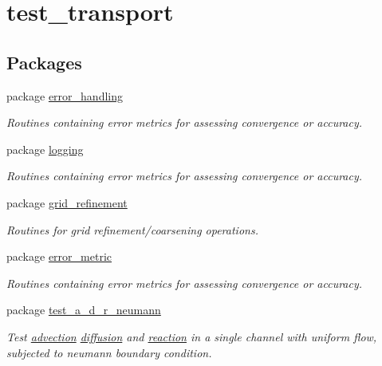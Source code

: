 \hypertarget{a00097}{
\section{test\_\-transport}
\label{a00097}
}
\subsection*{Packages}
\begin{CompactItemize}
\item 
package \hyperlink{a00057}{error\_\-handling}
\begin{CompactList}\small\item\em Routines containing error metrics for assessing convergence or accuracy. \item\end{CompactList}

\item 
package \hyperlink{a00065}{logging}
\begin{CompactList}\small\item\em Routines containing error metrics for assessing convergence or accuracy. \item\end{CompactList}

\item 
package \hyperlink{a00062}{grid\_\-refinement}
\begin{CompactList}\small\item\em Routines for grid refinement/coarsening operations. \item\end{CompactList}

\item 
package \hyperlink{a00058}{error\_\-metric}
\begin{CompactList}\small\item\em Routines containing error metrics for assessing convergence or accuracy. \item\end{CompactList}

\item 
package \hyperlink{a00073}{test\_\-a\_\-d\_\-r\_\-neumann}
\begin{CompactList}\small\item\em Test \hyperlink{a00052}{advection} \hyperlink{a00056}{diffusion} and \hyperlink{a00068}{reaction} in a single channel with uniform flow, subjected to neumann boundary condition. \item\end{CompactList}


\end{CompactItemize}
